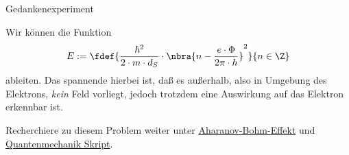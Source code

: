 \documentclass{subfiles}
\begin{document}
\begin{Experiment}{Gedankenexperiment}
\begin{Aufgabe}
            \end{Aufgabe}
            Wir können die Funktion 
            \[
                E :=\fdef{\frac{\hbar^2}{2\cdot m\cdot d_S}\cdot \nbra{n - \frac{e\cdot\Phi}{2\pi\cdot h}}^2}{n\in\Z}
            \]
            ableiten. Das spannende hierbei ist, daß es außerhalb, also in Umgebung des Elektrons, \emph{kein} Feld vorliegt, jedoch trotzdem eine Auswirkung auf das Elektron erkennbar ist.
            \begin{Aufgabe}
                \nr{} Recherchiere zu diesem Problem weiter unter \href{https://en.wikipedia.org/wiki/Aharonov–Bohm_effect}{Aharanov-Bohm-Effekt} und \href{https://www.thphys.uni-heidelberg.de/~wolschin/qms1920_5s.pdf}{Quantenmechanik Skript}.
            \end{Aufgabe}
        \end{Experiment}
\end{document}

